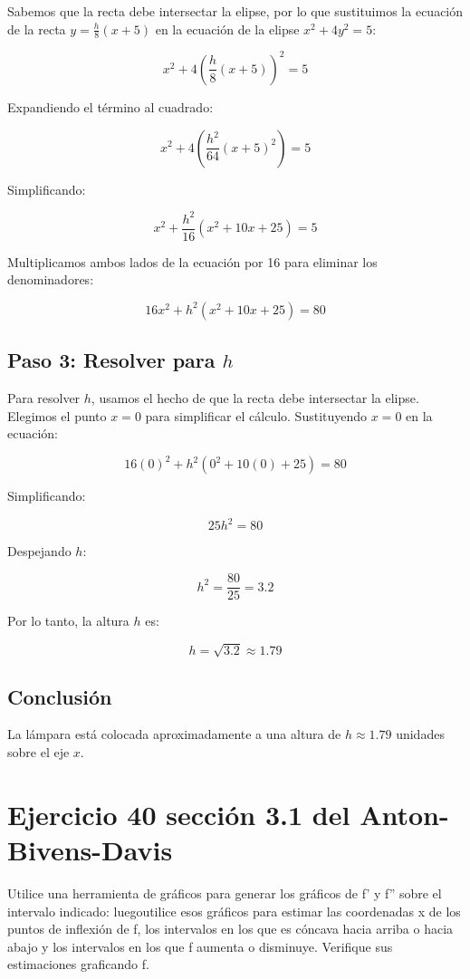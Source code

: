 \documentclass[11pt,letterpaper]{article}
\begin{document}
Sabemos que la recta debe intersectar la elipse, por lo que sustituimos la ecuación de la recta \( y = \frac{h}{8}(x + 5) \) en la ecuación de la elipse \( x^2 + 4y^2 = 5 \):

\[
x^2 + 4\left( \frac{h}{8}(x + 5) \right)^2 = 5
\]

Expandiendo el término al cuadrado:

\[
x^2 + 4\left( \frac{h^2}{64}(x + 5)^2 \right) = 5
\]

Simplificando:

\[
x^2 + \frac{h^2}{16}(x^2 + 10x + 25) = 5
\]

Multiplicamos ambos lados de la ecuación por 16 para eliminar los denominadores:

\[
16x^2 + h^2(x^2 + 10x + 25) = 80
\]

\subsection*{Paso 3: Resolver para \(h\)}

Para resolver \(h\), usamos el hecho de que la recta debe intersectar la elipse. Elegimos el punto \(x = 0\) para simplificar el cálculo. Sustituyendo \(x = 0\) en la ecuación:

\[
16(0)^2 + h^2(0^2 + 10(0) + 25) = 80
\]

Simplificando:

\[
25h^2 = 80
\]

Despejando \(h\):

\[
h^2 = \frac{80}{25} = 3.2
\]

Por lo tanto, la altura \(h\) es:

\[
h = \sqrt{3.2} \approx 1.79
\]

\subsection*{Conclusión}

La lámpara está colocada aproximadamente a una altura de \(h \approx 1.79\) unidades sobre el eje \(x\).

\section*{Ejercicio 40 sección 3.1 del Anton-Bivens-Davis}

Utilice una herramienta de gráficos para generar los gráficos de f' y f'' sobre el intervalo indicado: luegoutilice esos gráficos para estimar las coordenadas x de los puntos de inflexión de f, los intervalos en los que es cóncava hacia arriba o hacia abajo y los intervalos en los que f aumenta o disminuye. Verifique sus estimaciones graficando f.
\end{document}
